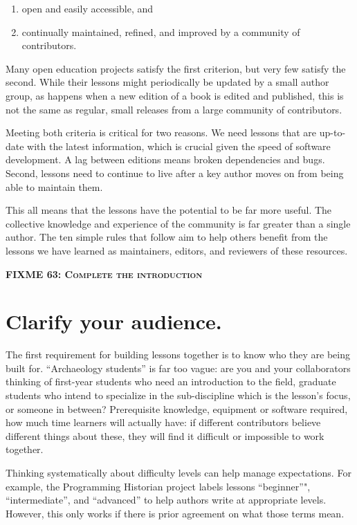 \documentclass[10pt,letterpaper]{article}
\newcommand{\fixme}[2]{\textsc{\textbf{FIXME {#1}: {#2}}}}
\newcommand{\rulemajor}[1]{\section{#1}}
\begin{document}
\begin{enumerate}

\item
  open and easily accessible, and

\item
  continually maintained, refined, and improved
  by a community of contributors.

\end{enumerate}

Many open education projects satisfy the first criterion,
but very few satisfy the second.
While their lessons might periodically be updated by a small author group,
as happens when a new edition of a book is edited and published,
this is not the same as regular, small releases
from a large community of contributors.

Meeting both criteria is critical for two reasons.
We need lessons that are up-to-date with the latest information,
which is crucial given the speed of software development.
A lag between editions means broken dependencies and bugs.
Second,
lessons need to continue to live after a key author moves on
from being able to maintain them.

This all means that the lessons have the potential to be far more useful.
The collective knowledge and experience of the community
is far greater than a single author. The ten simple rules
that follow aim to help others benefit from the
lessons we have learned as maintainers, editors, and reviewers of
these resources.

\fixme{63}{Complete the introduction}

\rulemajor{Clarify your audience.}

The first requirement for building lessons together is
to know who they are being built for.
``Archaeology students'' is far too vague:
are you and your collaborators thinking of
first-year students who need an introduction to the field,
graduate students who intend to specialize in the sub-discipline which is the lesson's focus,
or someone in between?
Prerequisite knowledge,
equipment or software required,
how much time learners will actually have:
if different contributors believe different things about these,
they will find it difficult or impossible to work together.

Thinking systematically about difficulty levels can help manage expectations.
For example,
the Programming Historian project labels lessons ``beginner''",
``intermediate'',
and ``advanced''
to help authors write at appropriate levels.
However,
this only works if there is prior agreement on what those terms mean.
\end{document}
